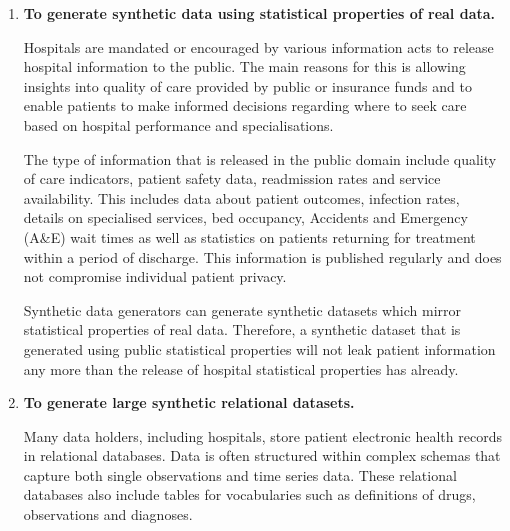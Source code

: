 \documentclass[11pt]{article}
\begin{document}

\begin{enumerate}[leftmargin=*]
    \item \textbf{To generate synthetic data using statistical properties of real data.
    }
    
    Hospitals are mandated or encouraged by various information acts to release hospital information to the public. The main reasons for this is allowing insights into quality of care provided by public or insurance funds and to enable patients to make informed decisions regarding where to seek care based on hospital performance and specialisations\cite{Werner2005}. 

    The type of information that is released in the public domain include quality of care indicators, patient safety data, readmission rates and service availability. This includes data about patient outcomes, infection rates, details on specialised services, bed occupancy, Accidents and Emergency (A\&E) wait times as well as statistics on patients returning for treatment within a period of discharge. This information is published regularly and does not compromise individual patient privacy.  

    Synthetic data generators can generate synthetic datasets which mirror statistical properties of real data. Therefore, a synthetic dataset that is generated using public statistical properties will not leak patient information any more than the release of hospital statistical properties has already. 
    
    

    \item \textbf{To generate large synthetic relational datasets.
    }
    
    Many data holders, including hospitals, store patient electronic health records in relational databases. Data is often structured within complex schemas that capture both single observations and time series data. These relational databases also include tables for vocabularies such as definitions of drugs, observations and diagnoses. 


\end{enumerate}
\end{document}
